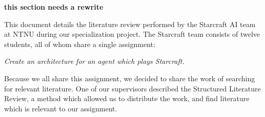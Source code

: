 \textbf{this section needs a rewrite}

This document details the literature review performed by the Starcraft AI team at NTNU during our specialization project.  The Starcraft team consists of twelve students, all of whom share a single assignment:

\emph{Create an architecture for an agent which plays Starcraft.}

Because we all share this assignment, we decided to share the work of searching for relevant literature.  One of our supervisors described the Structured Literature Review, a method which allowed us to distribute the work, and find literature which is relevant to our assignment.











